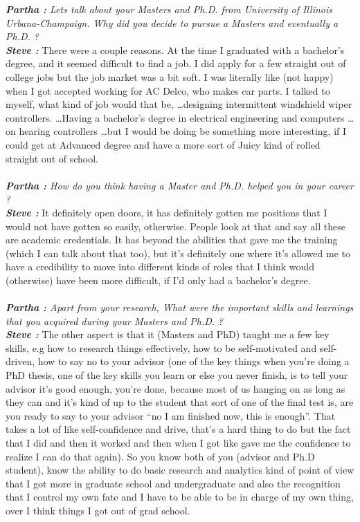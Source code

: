 \documentclass[a4paper, 12pt]{article}
\begin{document}
\begin{flushleft}
	\textit {\textbf{Partha :} Lets talk about your Masters and Ph.D. from University of Illinois Urbana-Champaign. Why did you decide to pursue a Masters and eventually a Ph.D. ?} \\ 
        \textbf {\textit {Steve :}} There were a couple reasons. At the time I graduated with a bachelor's degree, and it seemed difficult to find a job. I did apply for a few straight out of college jobs but the job market was a bit soft. I was literally like (not happy) when I got accepted working for AC Delco, who makes car parts. I talked to myself, what kind of job would that be, \ldots designing intermittent windshield wiper controllers. \ldots Having a bachelor's degree in electrical engineering and computers \ldots on hearing controllers \ldots  but I would be doing be something more interesting, if I could get at Advanced degree and have a more sort of Juicy kind of rolled straight out of school. \\~\\
	\textit {\textbf{Partha :} How do you think having a Master and Ph.D. helped you in your career ?} \\ 
        \textbf {\textit {Steve :}} It definitely open doors, it has definitely gotten me positions that I would not have gotten so easily, otherwise. People look at that and say all these are academic credentials. It has beyond the abilities that  gave me the training (which I can talk about that too), but it's definitely one where it's allowed me to have a credibility to move into different kinds of roles that I think would (otherwise) have been more difficult, if I'd only had a bachelor's degree. \\~\\
	\textit {\textbf{Partha :} Apart from your research, What were the important skills and learnings that you acquired during your Masters and Ph.D. ?} \\ 
        \textbf {\textit {Steve :}}  The other aspect is that it (Masters and PhD) taught me a few key skills, e.g  how to research things effectively, how to be self-motivated and self-driven, how to say no to your advisor (one of the key things when you're doing a PhD thesis, one of the key skills you learn or else you never finish, is to tell your advisor it's good enough, you're done, because most of us hanging on as long as they can and it's kind of up to the student that sort of one of the final test is, are you ready to say to your advisor “no I am finished now, this is enough”. That takes a lot of like self-confidence and drive, that's a hard thing to do but the fact that I did and then it worked and then when I got like gave me the confidence to realize I can do that again).  So you know both of you (advisor and Ph.D student), know the ability to do basic research and analytics kind of point of view that I got more in graduate school and undergraduate and also the recognition that I control my own fate and I have to be able to be in charge of my own thing, over I think things I got out of grad school. \\~\\

\end{flushleft}
\end{document}
